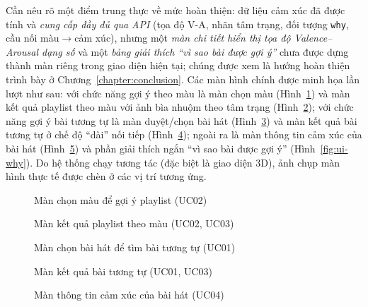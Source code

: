 \documentclass[../DoAn.tex]{subfiles}
\begin{document}
Cần nêu rõ một điểm trung thực về mức hoàn thiện: dữ liệu cảm xúc đã được tính và \textit{cung cấp đầy đủ qua API} (tọa độ V-A, nhãn tâm trạng, đối tượng \texttt{why}, cầu nối màu$\rightarrow$cảm xúc), nhưng một \textit{màn chi tiết hiển thị tọa độ Valence--Arousal dạng số} và một \textit{bảng giải thích ``vì sao bài được gợi ý''} chưa được dựng thành màn riêng trong giao diện hiện tại; chúng được xem là hướng hoàn thiện trình bày ở Chương~\ref{chapter:conclusion}. Các màn hình chính được minh họa lần lượt như sau: với chức năng gợi ý theo màu là màn chọn màu (Hình~\ref{fig:ui-color}) và màn kết quả playlist theo màu với ảnh bìa nhuộm theo tâm trạng (Hình~\ref{fig:ui-color-results}); với chức năng gợi ý bài tương tự là màn duyệt/chọn bài hát (Hình~\ref{fig:ui-browse}) và màn kết quả bài tương tự ở chế độ ``đài'' nối tiếp (Hình~\ref{fig:ui-similar}); ngoài ra là màn thông tin cảm xúc của bài hát (Hình~\ref{fig:ui-detail}) và phần giải thích ngắn ``vì sao bài được gợi ý'' (Hình~\ref{fig:ui-why}). Do hệ thống chạy tương tác (đặc biệt là giao diện 3D), ảnh chụp màn hình thực tế được chèn ở các vị trí tương ứng.

\begin{figure}[h!]
\centering
{}
\caption{Màn chọn màu để gợi ý playlist (UC02)}
\label{fig:ui-color}
\end{figure}

\begin{figure}[h!]
\centering
{}
\caption{Màn kết quả playlist theo màu (UC02, UC03)}
\label{fig:ui-color-results}
\end{figure}

\begin{figure}[h!]
\centering
{}
\caption{Màn chọn bài hát để tìm bài tương tự (UC01)}
\label{fig:ui-browse}
\end{figure}

\begin{figure}[h!]
\centering
{}
\caption{Màn kết quả bài tương tự (UC01, UC03)}
\label{fig:ui-similar}
\end{figure}

\begin{figure}[h!]
\centering
{}
\caption{Màn thông tin cảm xúc của bài hát (UC04)}
\label{fig:ui-detail}
\end{figure}
\end{document}
